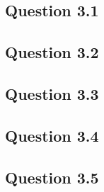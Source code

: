 \documentclass[11pt,twoside,a4paper]{article}
\begin{document}
 	\subsection{Question 3.1}
 	
 	\subsection{Question 3.2}
 	
 	\subsection{Question 3.3}
 	
 	\subsection{Question 3.4}
 	
 	\subsection{Question 3.5}
		
	
\begin{thebibliography}{9}
\end{thebibliography}
\end{document}
